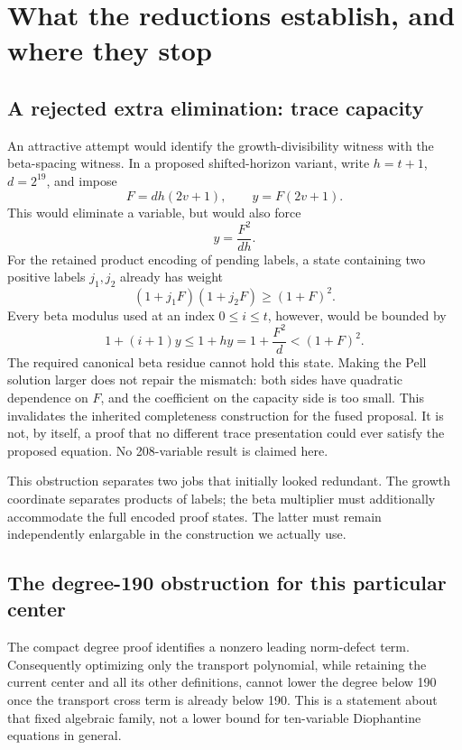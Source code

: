 \section{What the reductions establish, and where they stop}
\label{sec:limits}

\subsection{A rejected extra elimination: trace capacity}

An attractive attempt would identify the growth-divisibility witness with
the beta-spacing witness. In a proposed shifted-horizon variant, write
\(h=t+1\), \(d=2^{19}\), and impose
\[
 F=dh(2v+1),\qquad y=F(2v+1).
\]
This would eliminate a variable, but would also force
\[
 y=\frac{F^2}{dh}.
\]
For the retained product encoding of pending labels, a state containing
two positive labels \(j_1,j_2\) already has weight
\[
 (1+j_1F)(1+j_2F)\ge(1+F)^2.
\]
Every beta modulus used at an index \(0\le i\le t\), however, would be
bounded by
\[
 1+(i+1)y\le1+hy=1+\frac{F^2}{d}<(1+F)^2.
\]
The required canonical beta residue cannot hold this state. Making the
Pell solution larger does not repair the mismatch: both sides have
quadratic dependence on \(F\), and the coefficient on the capacity side
is too small. This invalidates the inherited completeness construction
for the fused proposal. It is not, by itself, a proof that no different
trace presentation could ever satisfy the proposed equation. No
208-variable result is claimed here.

This obstruction separates two jobs that initially looked redundant.
The growth coordinate separates products of labels; the beta multiplier
must additionally accommodate the full encoded proof states. The latter
must remain independently enlargable in the construction we actually use.

\subsection{The degree-190 obstruction for this particular center}

The compact degree proof identifies a nonzero leading norm-defect term.
Consequently optimizing only the transport polynomial, while retaining
the current center and all its other definitions, cannot lower the
degree below 190 once the transport cross term is already below 190.
This is a statement about that fixed algebraic family, not a lower bound
for ten-variable Diophantine equations in general.

